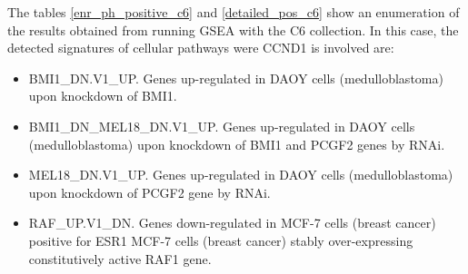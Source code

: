 \begin{table}[h!]
    \caption{Up-regulated gene sets for the C6 collection.}
    \label{detailed_pos_c6}
    \end{table}

The tables \ref{enr_ph_positive_c6} and \ref{detailed_pos_c6} show an enumeration of the results obtained from running GSEA with the C6 collection.
In this case, the detected signatures of cellular pathways were CCND1 is involved are:

\begin{itemize}
    \item BMI1\_DN.V1\_UP. Genes up-regulated in DAOY cells (medulloblastoma) upon knockdown of BMI1.
    \item BMI1\_DN\_MEL18\_DN.V1\_UP. Genes up-regulated in DAOY cells (medulloblastoma) upon knockdown of BMI1 and PCGF2 genes by RNAi.
    \item MEL18\_DN.V1\_UP. Genes up-regulated in DAOY cells (medulloblastoma) upon knockdown of PCGF2 gene by RNAi.
    \item RAF\_UP.V1\_DN. Genes down-regulated in MCF-7 cells (breast cancer) positive for ESR1 MCF-7 cells (breast cancer) stably over-expressing constitutively active RAF1 gene.
\end{itemize}



